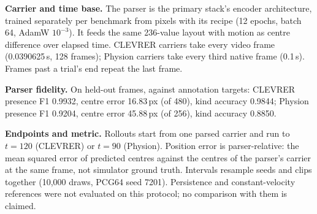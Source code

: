 \begin{revblock}
\textbf{Carrier and time base.} The parser is the primary stack's encoder architecture, trained separately per benchmark from pixels with its recipe (12 epochs, batch 64, AdamW $10^{-3}$). It feeds the same 236-value layout with motion as centre difference over elapsed time. CLEVRER carriers take every video frame (0.0390625\,s, 128 frames); Physion carriers take every third native frame (0.1\,s). Frames past a trial's end repeat the last frame.

\textbf{Parser fidelity.} On held-out frames, against annotation targets: CLEVRER presence F1 0.9932, centre error 16.83\,px (of 480), kind accuracy 0.9844; Physion presence F1 0.9204, centre error 45.88\,px (of 256), kind accuracy 0.8850.

\textbf{Endpoints and metric.} Rollouts start from one parsed carrier and run to $t=120$ (CLEVRER) or $t=90$ (Physion). Position error is parser-relative: the mean squared error of predicted centres against the centres of the parser's carrier at the same frame, not simulator ground truth. Intervals resample seeds and clips together (10,000 draws, PCG64 seed 7201). Persistence and constant-velocity references were not evaluated on this protocol; no comparison with them is claimed.
\end{revblock}
